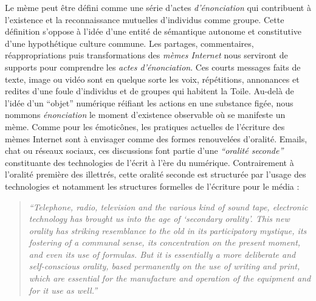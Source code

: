  
Le mème peut être défini comme une série d{\textquoteright}actes \textit{d{\textquoteright}énonciation} qui contribuent à l{\textquoteright}existence et la reconnaissance mutuelles d{\textquoteright}individus comme groupe. Cette définition s{\textquoteright}oppose à l'idée d{\textquoteright}une entité de sémantique autonome et constitutive d{\textquoteright}une hypothétique culture commune. Les partages, commentaires, réappropriations puis transformations des \textit{mèmes Internet }nous serviront de supports pour comprendre les \textit{actes d{\textquoteright}énonciation}. Ces courts messages faits de texte, image ou vidéo sont en quelque sorte les voix, répétitions, annonances et redites d{\textquoteright}une foule d{\textquoteright}individus et de groupes qui habitent la Toile. Au-delà de l{\textquoteright}idée d{\textquoteright}un {\textquotedblleft}objet{\textquotedblright} numérique réifiant les actions en une substance figée, nous nommons \textit{énonciation} le moment d{\textquoteright}existence observable o\`u se manifeste un mème. Comme pour les émoticônes, les pratiques actuelles de l{\textquoteright}écriture des mèmes Internet sont à envisager comme des formes renouvelées d{\textquoteright}oralité. Emails, chat ou réseaux sociaux, ces discussions font partie d{\textquoteright}une \textit{{\textquotedblleft}oralité seconde{\textquotedblright} }\citep{Ong1988} constituante des technologies de l{\textquoteright}écrit à l{\textquoteright}ère du numérique. Contrairement à l{\textquoteright}oralité première des illettrés, cette oralité seconde est structurée par l{\textquoteright}usage des technologies et notamment les structures formelles de l{\textquoteright}écriture pour le média :  

\begin{quote}
    \textit{``Telephone, radio, television and the various kind of sound tape, electronic technology has brought us into the age of {\textquoteleft}secondary orality{\textquoteright}. This new orality has striking resemblance to the old in its participatory mystique, its fostering of a communal sense, its concentration on the present moment, and even its use of formulas. But it is essentially a more deliberate and self-conscious orality, based permanently on the use of writing and print, which are essential for the manufacture and operation of the equipment and for it use as well.''} 
\citep{Ong1988}
\end{quote}

